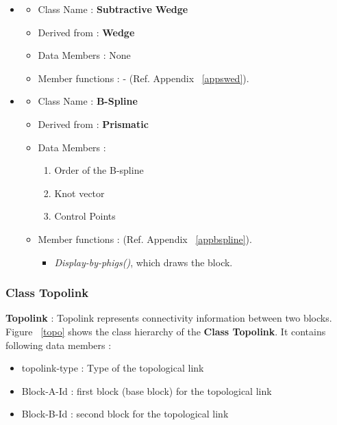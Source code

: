 \begin{itemize}
	\item

        \begin{itemize}
        \item   Class Name :    {\bf Subtractive Wedge}
        \item   Derived from :  {\bf Wedge}
        \item   Data Members :  None
        \item   Member functions : - (Ref. Appendix ~\ref{appswed}).
        \end{itemize}

	\item
        \begin{itemize}
        \item   Class Name :    {\bf B-Spline}
        \item   Derived from :  {\bf Prismatic}
        \item   Data Members :  
            \begin{enumerate}
            \item
            Order of the B-spline
            \item
            Knot vector
            \item
            Control Points
            \end{enumerate}
        \item   Member functions :
		(Ref. Appendix ~\ref{appbspline}).
        	\begin{itemize}
                \item
                {\em Display-by-phigs()}, which  draws the block.
        	\end{itemize}
        \end{itemize}

	\end{itemize}

	\subsubsection{Class Topolink}

	{\bf Topolink} : Topolink represents connectivity information between two
	blocks. Figure ~\ref{topo} shows the class hierarchy of the {\bf Class
	Topolink}. It contains following data members :


					\begin{itemize}
					\item	topolink-type :	Type of the topological link
					\item	Block-A-Id	: first block (base block) for
											the topological link
					\item	Block-B-Id	: second block for the topological link
					\end{itemize}

